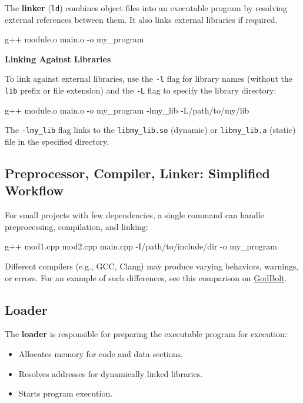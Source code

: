 The \textbf{linker} (\texttt{ld}) combines object files into an executable program by resolving external references between them. It also links external libraries if required.


    \begin{codeblock}[language=bash, numbers=none]
g++ module.o main.o -o my_program
    \end{codeblock}


\textbf{Linking Against Libraries}

To link against external libraries, use the \texttt{-l} flag for library names (without the \texttt{lib} prefix or file extension) and the \texttt{-L} flag to specify the library directory:

\begin{codeblock}[language=bash, numbers=none]
g++ module.o main.o -o my_program -lmy_lib -L/path/to/my/lib
\end{codeblock}

The \texttt{-lmy\_lib} flag links to the \texttt{libmy\_lib.so} (dynamic) or \texttt{libmy\_lib.a} (static) file in the specified directory.

\subsection{Preprocessor, Compiler, Linker: Simplified Workflow}

For small projects with few dependencies, a single command can handle preprocessing, compilation, and linking:

\begin{codeblock}[language=bash, numbers=none]
g++ mod1.cpp mod2.cpp main.cpp -I/path/to/include/dir -o my_program
\end{codeblock}

\begin{warningblock}
Different compilers (e.g., GCC, Clang) may produce varying behaviors, warnings, or errors. For an example of such differences, see this comparison on \href{https://godbolt.org/z/1M83E4sYE}{GodBolt}.
\end{warningblock}

\subsection{Loader}

The \textbf{loader} is responsible for preparing the executable program for execution:
\begin{itemize}
    \item Allocates memory for code and data sections.
    \item Resolves addresses for dynamically linked libraries.
    \item Starts program execution.
\end{itemize}

